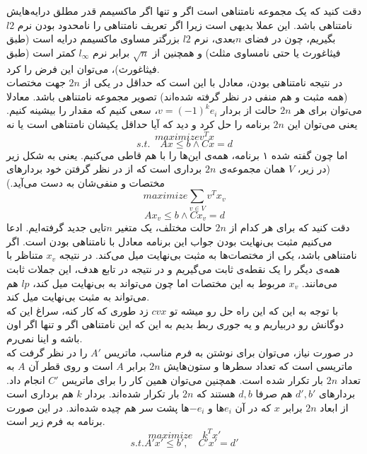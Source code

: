 دقت کنید که یک مجموعه نامتناهی است اگر و تنها اگر 
ماکسیمم قدر مطلق درایه‌هایش نامتناهی باشد. این عملا بدیهی است زیرا اگر تعریف نامتناهی را نامحدود بودن نرم $l2$ بگیریم، چون در فضای $n$بعدی، نرم $l2$ بزرگتر مساوی ماکسیمم درایه است  (طبق فیثاغورث یا حتی نامساوی مثلث) و همچنین از
$\sqrt{n}$
برابر نرم $l_\infty$ کمتر است (طبق فیثاغورث)، می‌توان این فرض را کرد.\\
در نتیجه نامتناهی بودن، معادل با این است که حداقل در یکی از $2n$ جهت مختصات (همه مثبت و هم منفی در نظر گرفته شده‌اند) تصویر مجموعه نامتناهی باشد. معادلا می‌توان برای هر $2n$ حالت از بردار 
$v=(-1)^{k}e_i$،
سعی کنیم که مقدار را بیشینه کنیم. یعنی می‌توان این $2n$ برنامه را حل کرد و دید که آیا حداقل یکیشان نامتناهی است یا نه
\[
maximize v^Tx\]\[
s.t. \quad Ax \le b \land Cx = d
\]
اما چون گفته شده ۱ برنامه، همه‌ی این‌ها را با هم قاطی می‌کنیم. یعنی به شکل زیر (در زیر، $V$ همان مجموعه‌ی $2n$ برداری است که از در نظر گرفتن خود بردار‌های مختصات و منفی‌شان به دست می‌آید.)
\[
maximize \sum_{v \in V} v^Tx_{v}\]\[
Ax_{v} \le b \land Cx_{v} = d
\]
دقت کنید که برای هر کدام از $2n$ حالت مختلف، یک متغیر $n$‌تایی جدید گرفته‌ایم. ادعا می‌کنیم مثبت بی‌نهایت بودن جواب این برنامه معادل با نامتناهی بودن 
است. اگر 
نامتناهی باشد، یکی از مختصات‌ها به مثبت بی‌نهایت میل می‌کند. در نتیجه 
$x_{v}$
متناظر با همه‌ی دیگر را یک نقطه‌ی ثابت می‌گیریم و در نتیجه در تابع هدف، این جملات ثابت می‌مانند. 
$x_{v}$
مربوط به این مختصات اما چون می‌تواند به بی‌نهایت میل کند، $lp$ هم می‌تواند به مثبت بی‌نهایت میل کند.\\
با توجه به این که این راه حل رو میشه تو $cvx$ زد طوری که کار کنه، سراغ این که دوگانش رو دربیاریم و یه جوری ربط بدیم به این که این نامتناهی اگر و تنها اگر اون 
باشه و اینا نمی‌رم. \\
در صورت نیاز، می‌توان برای نوشتن به فرم مناسب، ماتریس
$A'$
را در نظر گرفت که ماتریسی است که تعداد سطر‌ها و ستون‌هایش 
$2n$
 برابر $A$ است و روی قطر آن $A$ به تعداد 
 $2n$
  بار تکرار شده است. همچنین می‌توان همین کار را برای ماتریس $C'$ انجام داد. بردار‌های $d', b'$ هم صرفا $d, b$ هستند که $2n$ بار تکرار شده‌اند. بردار $k$ هم برداری است از ابعاد
$2n$
برابر $x$ که در آن $e_i$‌ها و $-e_i$‌ها پشت سر هم چیده شده‌اند. در این صورت برنامه به فرم زیر است.
\[
maximize \quad k^Tx'\]\[
s.t. A'x' \le b', \quad C'x' = d'
\]

